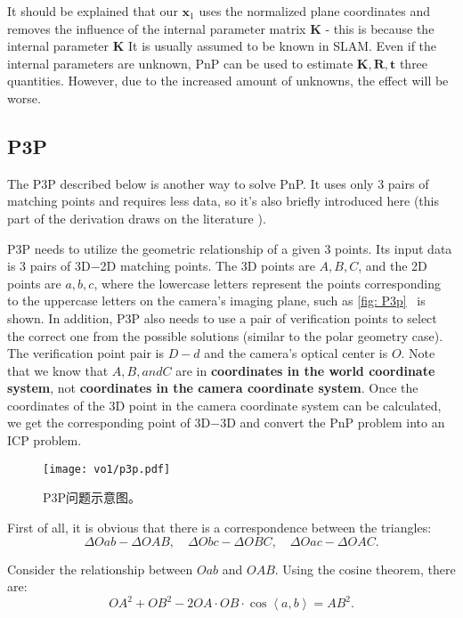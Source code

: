 It should be explained that our $\bm{x}_1$ uses the normalized plane coordinates and removes the influence of the internal parameter matrix $\bm{K}$ - this is because the internal parameter $\bm{K}$ It is usually assumed to be known in SLAM. Even if the internal parameters are unknown, PnP can be used to estimate $\bm{K}, \bm{R}, \bm{t}$ three quantities. However, due to the increased amount of unknowns, the effect will be worse.

\subsection{P3P}
The P3P described below is another way to solve PnP. It uses only 3 pairs of matching points and requires less data, so it's also briefly introduced here (this part of the derivation draws on the literature \cite{web:p3p}).

P3P needs to utilize the geometric relationship of a given 3 points. Its input data is 3 pairs of 3D−2D matching points. The 3D points are $A, B, C$, and the 2D points are $a, b, c$, where the lowercase letters represent the points corresponding to the uppercase letters on the camera's imaging plane, such as \autoref{fig: P3p}~ is shown. In addition, P3P also needs to use a pair of verification points to select the correct one from the possible solutions (similar to the polar geometry case). The verification point pair is $D-d$ and the camera's optical center is $O$. Note that we know that $A, B, and C$ are in \textbf{coordinates in the world coordinate system}, not \textbf{coordinates in the camera coordinate system}. Once the coordinates of the 3D point in the camera coordinate system can be calculated, we get the corresponding point of 3D−3D and convert the PnP problem into an ICP problem.
\begin{figure}[!ht]
	\centering
	\texttt{[image: vo1/p3p.pdf]}
	\caption{P3P问题示意图。}
	\label{fig:p3p}
\end{figure}

First of all, it is obvious that there is a correspondence between the triangles:
\begin{equation}
\Delta Oab - \Delta OAB, \quad \Delta Obc - \Delta OBC, \quad \Delta Oac - \Delta OAC.
\end{equation}

Consider the relationship between $Oab$ and $OAB$. Using the cosine theorem, there are:
\begin{equation}
O{A^2} + O{B^2} - 2OA \cdot OB \cdot \cos \left\langle a,b \right \rangle = A{B^2}.
\end{equation}

